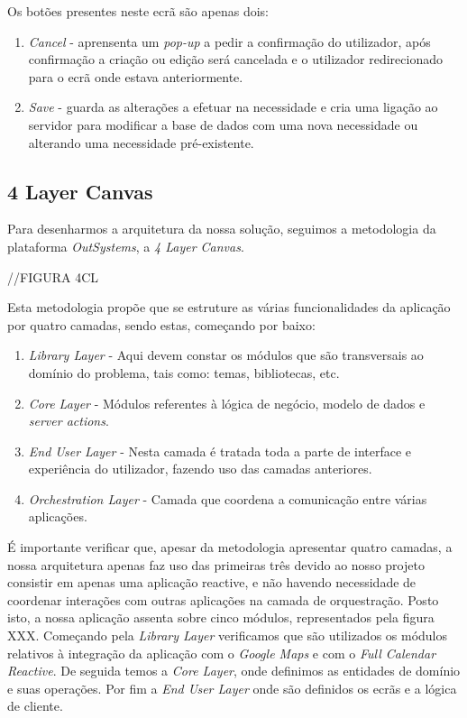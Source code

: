 Os botões presentes neste ecrã são apenas dois:
\begin{enumerate}
    \item \textit{Cancel} - aprensenta um \textit{pop-up} a pedir a confirmação do utilizador, após confirmação a criação ou edição será cancelada e o utilizador redirecionado para o ecrã onde estava anteriormente.
    \item \textit{Save} - guarda as alterações a efetuar na necessidade e cria uma ligação ao servidor para modificar a base de dados com uma nova necessidade ou alterando uma necessidade pré-existente.
\end{enumerate}

\subsection{4 Layer Canvas} \label{4layerCanvas}

Para desenharmos a arquitetura da nossa solução, seguimos a metodologia da plataforma \textit{OutSystems}, a \textit{4 Layer Canvas}.


//FIGURA 4CL


Esta metodologia propõe que se estruture as várias funcionalidades da aplicação por quatro camadas, sendo estas, começando por baixo: 
\begin{enumerate}
    \item \textit{Library Layer} - Aqui devem constar os módulos que são transversais ao domínio do problema, tais como: temas, bibliotecas, etc. 
    \item \textit{Core Layer} - Módulos referentes à lógica de negócio, modelo de dados e \textit{server actions}. 
    \item \textit{End User Layer} - Nesta camada é tratada toda a parte de interface e experiência do utilizador, fazendo uso das camadas anteriores. 
    \item \textit{Orchestration Layer} - Camada que coordena a comunicação entre várias aplicações. 
\end{enumerate}

É importante verificar que, apesar da metodologia apresentar quatro camadas, a nossa arquitetura apenas faz uso das primeiras três devido ao nosso projeto consistir em apenas uma aplicação reactive, e não havendo necessidade de coordenar interações com outras aplicações na camada de orquestração. Posto isto, a nossa aplicação assenta sobre cinco módulos, representados pela figura XXX. Começando pela \textit{Library Layer} verificamos que são utilizados os módulos relativos à integração da aplicação com o \textit{Google Maps} e com o \textit{Full Calendar Reactive}. De seguida temos a \textit{ Core Layer}, onde definimos as entidades de domínio e suas operações. Por fim a \textit{ End User Layer} onde são definidos os ecrãs e a lógica de cliente. 


